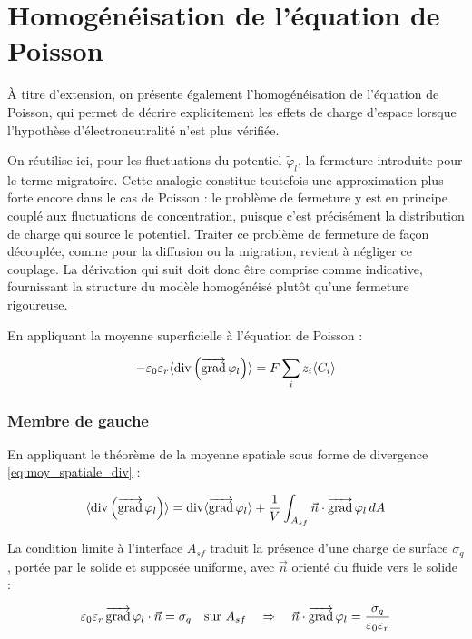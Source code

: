 \section*{Homogénéisation de l'équation de Poisson}
À titre d'extension, on présente également l'homogénéisation de
l'équation de Poisson, qui permet de décrire explicitement les
effets de charge d'espace lorsque l'hypothèse d'électroneutralité n'est plus vérifiée.

On réutilise ici, pour les fluctuations du potentiel $\widetilde{\varphi}_l$,
la fermeture introduite pour le terme migratoire. Cette analogie constitue
toutefois une approximation plus forte encore dans le cas de Poisson :
le problème de fermeture y est en principe couplé aux fluctuations de
concentration, puisque c'est précisément la distribution de charge qui
source le potentiel. Traiter ce problème de fermeture de façon découplée,
comme pour la diffusion ou la migration, revient à négliger ce couplage. La
dérivation qui suit doit donc être comprise comme indicative, fournissant la
structure du modèle homogénéisé plutôt qu'une fermeture rigoureuse.

En appliquant la moyenne superficielle à l'équation de Poisson :

\begin{equation}
-\varepsilon_0 \varepsilon_r \langle \operatorname{div}\left(\mathop{\overrightarrow{\operatorname{grad}}}\nolimits \varphi_l\right) \rangle = F\sum_i z_i \langle C_i \rangle
\end{equation}

\subsubsection*{Membre de gauche}

En appliquant le théorème de la moyenne spatiale sous forme de divergence \eqref{eq:moy_spatiale_div} :

\begin{equation}
\langle \operatorname{div}\left(\mathop{\overrightarrow{\operatorname{grad}}}\nolimits\varphi_l\right) \rangle = \operatorname{div}\langle \mathop{\overrightarrow{\operatorname{grad}}}\nolimits\varphi_l \rangle + \frac{1}{V}\int_{A_{sf}} \vec{n}\cdot\mathop{\overrightarrow{\operatorname{grad}}}\nolimits\varphi_l\, dA
\end{equation}

La condition limite à l'interface $A_{sf}$ traduit la présence d'une
charge de surface $\sigma_q$, portée par le solide et supposée uniforme, avec
$\vec{n}$ orienté du fluide vers le solide :

\begin{equation}
\varepsilon_0 \varepsilon_r \mathop{\overrightarrow{\operatorname{grad}}}\nolimits\varphi_l \cdot \vec{n} = \sigma_q
\quad \text{sur } A_{sf}
\quad \Rightarrow \quad
\vec{n}\cdot\mathop{\overrightarrow{\operatorname{grad}}}\nolimits\varphi_l = \frac{\sigma_q}{\varepsilon_0 \varepsilon_r}
\end{equation}

